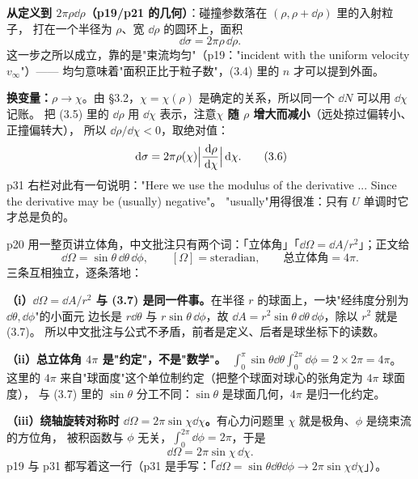 \documentclass[11pt]{ctexart}
\providecommand{\th}{}\renewcommand{\th}{\theta}
\begin{document}
\textbf{从定义到 $2\pi\rho\dd\rho$（p19/p21 的几何）}：碰撞参数落在 $(\rho,\rho+\dd\rho)$ 里的入射粒子，
打在一个半径为 $\rho$、宽 $\dd\rho$ 的圆环上，面积
\[
\dd\sigma=2\pi\rho\,\dd\rho . \tag{3.5}
\]
这一步之所以成立，靠的是"束流均匀"（p19："incident with the uniform velocity $v_\infty$"）——
均匀意味着"面积正比于粒子数"，(3.4) 里的 $n$ 才可以提到外面。

\textbf{换变量：$\rho\to\chi$}。由 §3.2，$\chi=\chi(\rho)$ 是确定的关系，所以同一个 $\dd N$ 可以用 $\dd\chi$ 记账。
把 (3.5) 里的 $\dd\rho$ 用 $\dd\chi$ 表示，注意\textbf{$\chi$ 随 $\rho$ 增大而减小}（远处掠过偏转小、正撞偏转大），
所以 $\dd\rho/\dd\chi<0$，取绝对值：
\[
\,\mathrm{d}\sigma=2\pi\rho(\chi)\Bigl|\frac{\,\mathrm{d}\rho}{\,\mathrm{d}\chi}\Bigr|\,\mathrm{d}\chi . \tag{3.6}
\]
p31 右栏对此有一句说明："Here we use the modulus of the derivative ... Since the derivative may be (usually) negative"。
"usually"用得很准：只有 $U$ 单调时它才总是负的。



p20 用一整页讲立体角，中文批注只有两个词：「立体角」「$\dd\Omega=\dd A/r^2$」；正文给
\[
\dd\Omega=\sin\th\,\dd\th\,\dd\phi,\qquad [\Omega]=\text{steradian},\qquad \text{总立体角}=4\pi . \tag{3.7}
\]
三条互相独立，逐条落地：

\textbf{（i）$\dd\Omega=\dd A/r^2$ 与 (3.7) 是同一件事。}在半径 $r$ 的球面上，一块"经纬度分别为 $\dd\th,\dd\phi$"的小面元
边长是 $r\dd\th$ 与 $r\sin\th\,\dd\phi$，故 $\dd A=r^2\sin\th\,\dd\th\,\dd\phi$，除以 $r^2$ 就是 (3.7)。
所以中文批注与公式不矛盾，前者是定义、后者是球坐标下的读数。

\textbf{（ii）总立体角 $4\pi$ 是"约定"，不是"数学"。}\ $\int_0^{\pi}\!\sin\th\dd\th\int_0^{2\pi}\!\dd\phi=2\times2\pi=4\pi$。
这里的 $4\pi$ 来自"球面度"这个单位制约定（把整个球面对球心的张角定为 $4\pi$ 球面度），
与 (3.7) 里的 $\sin\th$ 分工不同：$\sin\th$ 是球面几何，$4\pi$ 是归一化约定。

\textbf{（iii）绕轴旋转对称时 $\dd\Omega=2\pi\sin\chi\dd\chi$。}有心力问题里 $\chi$ 就是极角、$\phi$ 是绕束流的方位角，
被积函数与 $\phi$ 无关，$\int_0^{2\pi}\dd\phi=2\pi$，于是
\[
\dd\Omega=2\pi\sin\chi\,\dd\chi . \tag{3.8}
\]
p19 与 p31 都写着这一行（p31 是手写：「$\dd\Omega=\sin\th\dd\th\dd\phi\to2\pi\sin\chi\dd\chi$」）。
\end{document}
